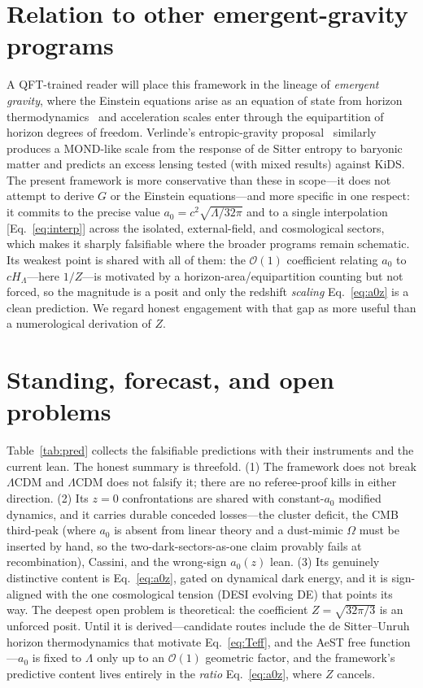 \documentclass[aps,prd,twocolumn,10pt,nofootinbib,superscriptaddress]{revtex4-2}
\begin{document}
\section{Relation to other emergent-gravity programs}
A QFT-trained reader will place this framework in the lineage of \emph{emergent gravity}, where the Einstein
equations arise as an equation of state from horizon thermodynamics~\cite{Jacobson1995,Padmanabhan2010} and
acceleration scales enter through the equipartition of horizon degrees of freedom. Verlinde's entropic-gravity
proposal~\cite{Verlinde2017} similarly produces a MOND-like scale from the response of de Sitter entropy to baryonic
matter and predicts an excess lensing tested (with mixed results) against KiDS. The present framework is more
conservative than these in scope---it does not attempt to derive $G$ or the Einstein equations---and more specific
in one respect: it commits to the precise value $a_0=c^2\sqrt{\Lambda/32\pi}$ and to a single interpolation
[Eq.~\eqref{eq:interp}] across the isolated, external-field, and cosmological sectors, which makes it sharply
falsifiable where the broader programs remain schematic. Its weakest point is shared with all of them: the
$\mathcal{O}(1)$ coefficient relating $a_0$ to $cH_\Lambda$---here $1/Z$---is motivated by a horizon-area/equipartition
counting but not forced, so the magnitude is a posit and only the redshift \emph{scaling} Eq.~\eqref{eq:a0z} is a
clean prediction. We regard honest engagement with that gap as more useful than a numerological derivation of $Z$.

\section{Standing, forecast, and open problems}
Table~\ref{tab:pred} collects the falsifiable predictions with their instruments and the current lean. The honest
summary is threefold. (1) The framework does not break $\Lambda$CDM and $\Lambda$CDM does not falsify it; there are
no referee-proof kills in either direction. (2) Its $z\!=\!0$ confrontations are shared with constant-$a_0$ modified
dynamics, and it carries durable conceded losses---the cluster deficit, the CMB
third-peak (where $a_0$ is absent from linear theory and a dust-mimic $\Omega$ must be inserted by hand, so the
two-dark-sectors-as-one claim provably fails at recombination), Cassini, and the wrong-sign $a_0(z)$ lean. (3) Its
genuinely distinctive content is Eq.~\eqref{eq:a0z}, gated on dynamical dark energy, and it is sign-aligned with the
one cosmological tension (DESI evolving DE) that points its way. The deepest open problem is theoretical: the
coefficient $Z=\sqrt{32\pi/3}$ is an unforced posit. Until it is derived---candidate routes include the de
Sitter--Unruh horizon thermodynamics that motivate Eq.~\eqref{eq:Teff}, and the AeST free function---$a_0$ is fixed
to $\Lambda$ only up to an $\mathcal{O}(1)$ geometric factor, and the framework's predictive content lives entirely
in the \emph{ratio} Eq.~\eqref{eq:a0z}, where $Z$ cancels.
\end{document}
